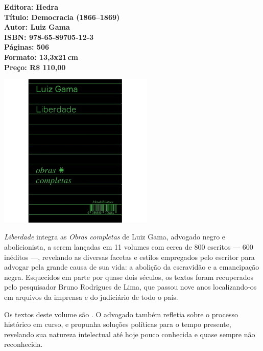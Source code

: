 \vfill

\noindent\begin{minipage}[c]{1\linewidth}
{\small\textbf{
\hspace*{-.1cm}Editora: Hedra\\
Título: Democracia (1866--1869)\\
Autor: Luiz Gama\\ 
ISBN: 978-65-89705-12-3\\
Páginas: 506\\
Formato: 13,3x21\,cm\\
Preço: R\$ 110,00\\
}}
\end{minipage}

\pagebreak

\begin{center}
\hspace*{.5cm}\includegraphics[width=74mm]{./CAPAS/liberdade.jpg}
\end{center}

\hspace*{-7cm}\hrulefill\hspace*{-7cm}

\medskip

\noindent{}\textit{Liberdade} integra as \textit{Obras completas} de Luiz Gama, advogado negro e abolicionista, a serem lançadas em 11 volumes com cerca de 800 escritos --- 600 inéditos ---, revelando as diversas facetas e estilos empregados pelo escritor para advogar pela grande causa de sua vida: a abolição da escravidão e a emancipação negra. Esquecidos em parte por quase dois séculos, os textos foram recuperados pelo pesquisador Bruno Rodrigues de Lima, que passou nove anos localizando-os em arquivos da imprensa e do judiciário de todo o país.

Os textos deste volume são . O advogado também refletia sobre o processo histórico em curso, e propunha soluções políticas para o tempo presente, revelando sua natureza intelectual até hoje pouco conhecida e quase sempre não reconhecida.

